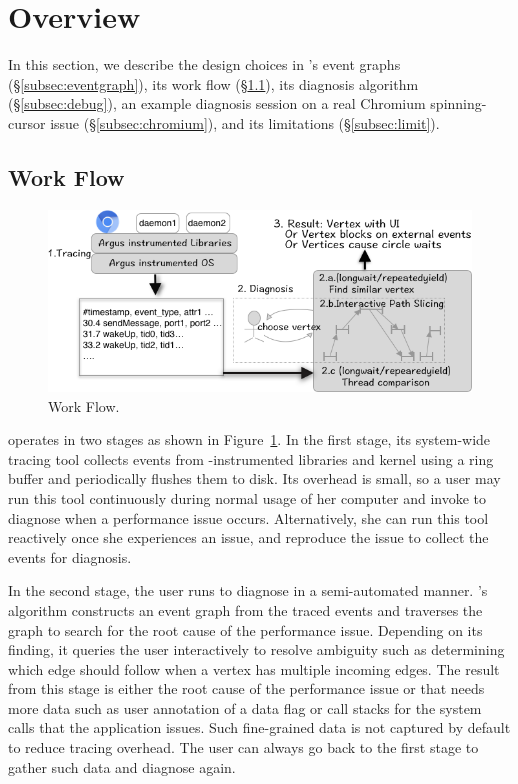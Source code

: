 \section{Overview}\label{sec:overview}

In this section, we describe the design choices in \xxx's event graphs
(\S\ref{subsec:eventgraph}), its work flow (\S\ref{subsec:overflow}), its
diagnosis algorithm (\S\ref{subsec:debug}), an example diagnosis session
on a real Chromium spinning-cursor issue (\S\ref{subsec:chromium}), and
its limitations (\S\ref{subsec:limit}).



\subsection{\xxx Work Flow} \label{subsec:overflow}

\begin{figure}[tb]
    \centering
	\includegraphics[width=\columnwidth]{./figures/Argus_overview.png}
    \caption{\xxx Work Flow.}
    \label{fig:argus-overview}
\end{figure}

\xxx operates in two stages as shown in
Figure~\ref{fig:argus-overview}. In the first stage, its system-wide
tracing tool collects events from \xxx-instrumented libraries and kernel
using a ring buffer and periodically flushes them to disk.  Its overhead
is small, so a user may run this tool continuously during normal usage of
her computer and invoke \xxx to diagnose when a performance issue occurs.
Alternatively, she can run this tool reactively once she experiences an
issue, and reproduce the issue to collect the events for diagnosis.

In the second stage, the user runs \xxx to diagnose in a semi-automated
manner.  \xxx's algorithm constructs an event graph from the traced events
and traverses the graph to search for the root cause of the performance
issue.  Depending on its finding, it queries the user interactively to
resolve ambiguity such as determining which edge \xxx should follow when a
vertex has multiple incoming edges.  The result from this stage is either
the root cause of the performance issue or that \xxx needs more data such
as user annotation of a data flag or call stacks for the system calls that
the application issues.  Such fine-grained data is not captured by default
to reduce tracing overhead.  The user can always go back to the first
stage to gather such data and diagnose again.

